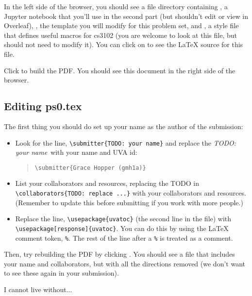 \documentclass[11pt]{article}
\begin{document}
{In the left side of the browser, you should see a file directory containing , a Jupyter notebook that you'll use in the second part (but shouldn't edit or view in Overleaf), , the template you will modify for this problem set, and , a style file that defines useful macros for cs3102 (you are welcome to look at this file, but should not need to modify it). You can click on  to see the LaTeX source for this file.

Click  to build the PDF. You should see this document in the right side of the browser.

\subsection{Editing ps0.tex}

The first thing you should do set up your name as the author of the submission:
\begin{itemize}
    \item Look for the line, \texttt{\textbackslash submitter\{TODO: your name\}} and replace the {\em TODO: your name}\ with your name and UVA id:
    \begin{quote}
        \texttt{\textbackslash submitter\{Grace Hopper (gmh1a)\}}
    \end{quote}
\item List your collaborators and resources, replacing the TODO in {\texttt{\textbackslash collaborators\{TODO: replace ...\}}} with your collaborators and resources. (Remember to update this before submitting if you work with more people.)

\item Replace the line, \texttt{\textbackslash usepackage\{uvatoc\}} (the second line in the file) with \texttt{\textbackslash usepackage[response]\{uvatoc\}}. You can do this by using the LaTeX comment token, {\texttt{\%}}. The rest of the line after a {\texttt{\%}} is treated as a comment. 
\end{itemize}
Then, try rebuilding the PDF by clicking . You should see a file that includes your name and collaborators, but with all the directions removed (we don't want to see these again in your submission).
}

\begin{problem}
I cannot live without...\end{problem}
\end{document}
